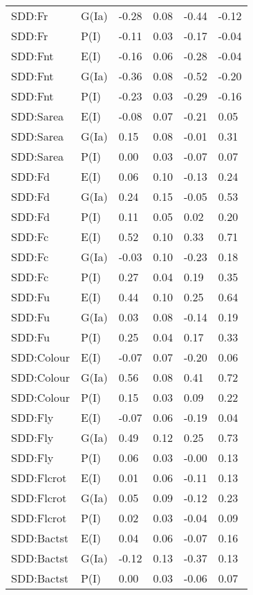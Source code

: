 \begin{center}
\begin{longtable}{|p{1.1in}|p{0.7in}|p{0.7in}|p{0.6in}|p{0.6in}|p{0.6in}|}
  SDD:Fr & G(Ia) & -0.28 & 0.08 & -0.44 & -0.12 \\ 
  SDD:Fr & P(I) & -0.11 & 0.03 & -0.17 & -0.04 \\ 
  SDD:Fnt & E(I) & -0.16 & 0.06 & -0.28 & -0.04 \\ 
  SDD:Fnt & G(Ia) & -0.36 & 0.08 & -0.52 & -0.20 \\ 
  SDD:Fnt & P(I) & -0.23 & 0.03 & -0.29 & -0.16 \\ 
  SDD:Sarea & E(I) & -0.08 & 0.07 & -0.21 & 0.05 \\ 
  SDD:Sarea & G(Ia) & 0.15 & 0.08 & -0.01 & 0.31 \\ 
  SDD:Sarea & P(I) & 0.00 & 0.03 & -0.07 & 0.07 \\ 
  SDD:Fd & E(I) & 0.06 & 0.10 & -0.13 & 0.24 \\ 
  SDD:Fd & G(Ia) & 0.24 & 0.15 & -0.05 & 0.53 \\ 
  SDD:Fd & P(I) & 0.11 & 0.05 & 0.02 & 0.20 \\ 
  SDD:Fc & E(I) & 0.52 & 0.10 & 0.33 & 0.71 \\ 
  SDD:Fc & G(Ia) & -0.03 & 0.10 & -0.23 & 0.18 \\ 
  SDD:Fc & P(I) & 0.27 & 0.04 & 0.19 & 0.35 \\ 
  SDD:Fu & E(I) & 0.44 & 0.10 & 0.25 & 0.64 \\ 
  SDD:Fu & G(Ia) & 0.03 & 0.08 & -0.14 & 0.19 \\ 
  SDD:Fu & P(I) & 0.25 & 0.04 & 0.17 & 0.33 \\ 
  SDD:Colour & E(I) & -0.07 & 0.07 & -0.20 & 0.06 \\ 
  SDD:Colour & G(Ia) & 0.56 & 0.08 & 0.41 & 0.72 \\ 
  SDD:Colour & P(I) & 0.15 & 0.03 & 0.09 & 0.22 \\ 
  SDD:Fly & E(I) & -0.07 & 0.06 & -0.19 & 0.04 \\ 
  SDD:Fly & G(Ia) & 0.49 & 0.12 & 0.25 & 0.73 \\ 
  SDD:Fly & P(I) & 0.06 & 0.03 & -0.00 & 0.13 \\ 
  SDD:Flcrot & E(I) & 0.01 & 0.06 & -0.11 & 0.13 \\ 
  SDD:Flcrot & G(Ia) & 0.05 & 0.09 & -0.12 & 0.23 \\ 
  SDD:Flcrot & P(I) & 0.02 & 0.03 & -0.04 & 0.09 \\ 
  SDD:Bactst & E(I) & 0.04 & 0.06 & -0.07 & 0.16 \\ 
  SDD:Bactst & G(Ia) & -0.12 & 0.13 & -0.37 & 0.13 \\ 
  SDD:Bactst & P(I) & 0.00 & 0.03 & -0.06 & 0.07 \\ 

\end{longtable}
\end{center}
